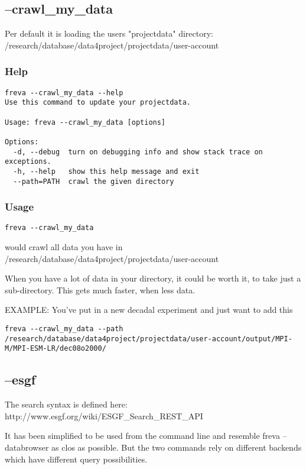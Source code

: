 \documentclass[a4paper,11pt]{ltxdoc}
\begin{document}
\subsection{--crawl\_my\_data}

Per default it is loading the users "projectdata" directory: \\
/research/database/data4project/projectdata/user-account

\subsubsection*{Help}
\begin{verbatim}
freva --crawl_my_data --help
Use this command to update your projectdata.

Usage: freva --crawl_my_data [options]

Options:
  -d, --debug  turn on debugging info and show stack trace on exceptions.
  -h, --help   show this help message and exit
  --path=PATH  crawl the given directory
\end{verbatim}

\subsubsection*{Usage}
\begin{verbatim}
freva --crawl_my_data
\end{verbatim}

would crawl all data you have in
/research/database/data4project/projectdata/user-account

When you have a lot of data in your directory, it could be worth it,
to take just a sub-directory. This gets much faster, when less data.

EXAMPLE: You've put in a new decadal experiment and just want to add this
\begin{verbatim}
freva --crawl_my_data --path 
/research/database/data4project/projectdata/user-account/output/MPI-M/MPI-ESM-LR/dec08o2000/
\end{verbatim}

\subsection{--esgf}
The search syntax is defined here: http://www.esgf.org/wiki/ESGF\_Search\_REST\_API

It has been simplified to be used from the command line and resemble freva --databrowser as clos as possible. 
But the two commands rely on different backends which have different query possibilities.
\end{document}
